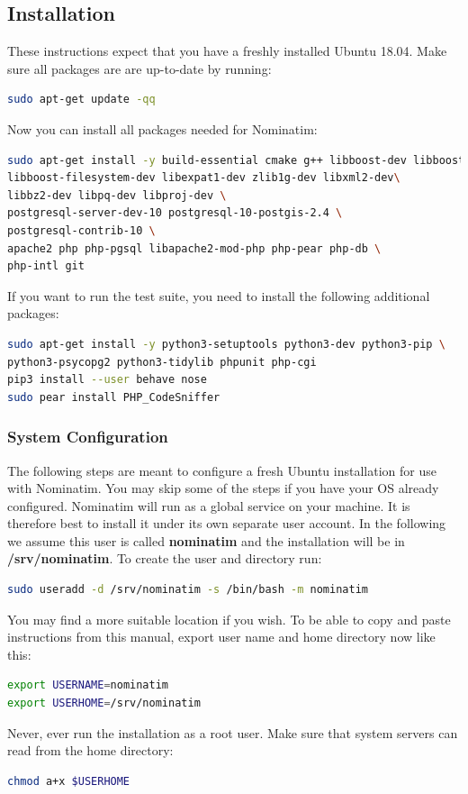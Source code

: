 \documentclass[12pt]{article}
\begin{document}
\subsection{Installation}
These instructions expect that you have a freshly installed Ubuntu 18.04.
Make sure all packages are are up-to-date by running:
\begin{lstlisting}[language=bash,breaklines=true]
sudo apt-get update -qq
\end{lstlisting}
Now you can install all packages needed for Nominatim:
\begin{lstlisting}[language=bash,breaklines=true]
sudo apt-get install -y build-essential cmake g++ libboost-dev libboost-system-dev \
libboost-filesystem-dev libexpat1-dev zlib1g-dev libxml2-dev\
libbz2-dev libpq-dev libproj-dev \
postgresql-server-dev-10 postgresql-10-postgis-2.4 \
postgresql-contrib-10 \
apache2 php php-pgsql libapache2-mod-php php-pear php-db \
php-intl git
\end{lstlisting}
If you want to run the test suite, you need to install the following additional packages:
\begin{lstlisting}[language=bash,breaklines=true]
sudo apt-get install -y python3-setuptools python3-dev python3-pip \
python3-psycopg2 python3-tidylib phpunit php-cgi
pip3 install --user behave nose
sudo pear install PHP_CodeSniffer
\end{lstlisting}
\subsubsection{System Configuration}
The following steps are meant to configure a fresh Ubuntu installation for use with Nominatim.
You may skip some of the steps if you have your OS already configured.
Nominatim will run as a global service on your machine. It is therefore best to install it under its
own separate user account. In the following we assume this user is called \textbf{nominatim} and the
installation will be in \textbf{/srv/nominatim}. To create the user and directory run:
\begin{lstlisting}[language=bash,breaklines=true]
sudo useradd -d /srv/nominatim -s /bin/bash -m nominatim
\end{lstlisting}
You may find a more suitable location if you wish.
To be able to copy and paste instructions from this manual, export user name and home
directory now like this:
\begin{lstlisting}[language=bash,breaklines=true]
export USERNAME=nominatim
export USERHOME=/srv/nominatim
\end{lstlisting}
Never, ever run the installation as a root user.
Make sure that system servers can read from the home directory:
\begin{lstlisting}[language=bash,breaklines=true]
chmod a+x $USERHOME
\end{lstlisting}
\end{document}
